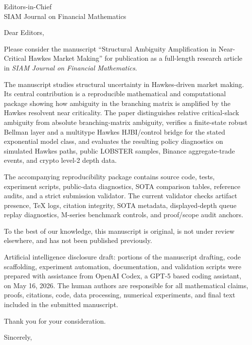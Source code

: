 \documentclass[11pt]{letter}
\date{May 16, 2026}
\begin{document}
\begin{letter}{Editors-in-Chief\\SIAM Journal on Financial Mathematics}

\opening{Dear Editors,}

Please consider the manuscript ``Structural Ambiguity Amplification in
Near-Critical Hawkes Market Making'' for publication as a full-length research
article in \emph{SIAM Journal on Financial Mathematics}.

The manuscript studies structural uncertainty in Hawkes-driven market making.
Its central contribution is a reproducible mathematical and computational
package showing how ambiguity in the branching matrix is amplified by the
Hawkes resolvent near criticality. The paper distinguishes relative
critical-slack ambiguity from absolute branching-matrix ambiguity, verifies a
finite-state robust Bellman layer and a multitype Hawkes HJBI/control bridge
for the stated exponential model class, and evaluates the resulting policy
diagnostics on simulated Hawkes paths, public LOBSTER samples, Binance
aggregate-trade events, and crypto level-2 depth data.

The accompanying reproducibility package contains source code, tests,
experiment scripts, public-data diagnostics, SOTA comparison tables, reference
audits, and a strict submission validator. The current validator checks
artifact presence, TeX logs, citation integrity, SOTA metadata, displayed-depth
queue replay diagnostics, M-series benchmark controls, and proof/scope audit
anchors.

To the best of our knowledge, this manuscript is original, is not under review
elsewhere, and has not been published previously.

Artificial intelligence disclosure draft: portions of the manuscript drafting,
code scaffolding, experiment automation, documentation, and validation scripts
were prepared with assistance from OpenAI Codex, a GPT-5 based coding
assistant, on May 16, 2026. The human authors are responsible for all
mathematical claims, proofs, citations, code, data processing, numerical
experiments, and final text included in the submitted manuscript.

Thank you for your consideration.

\closing{Sincerely,}

\end{letter}
\end{document}
